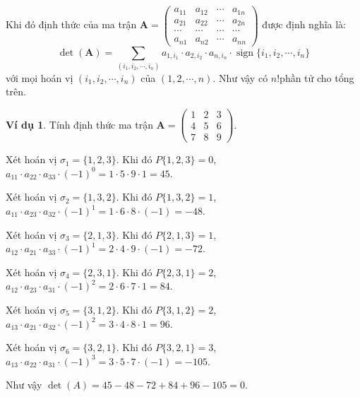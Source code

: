 \documentclass{mynotes}
\theoremstyle{definition}
\newtheorem{example}{Ví dụ}
\DeclareMathOperator{\sign}{sign}
\begin{document}
\begin{definition}
    Khi đó định thức của ma trận $\bm{A} = \begin{pmatrix}a_{11} & a_{12} & \cdots & a_{1n} \\ a_{21} & a_{22} & \cdots & a_{2n} \\ \cdots & \cdots & \cdots & \cdots \\ a_{n1} & a_{n2} & \cdots & a_{nn}\end{pmatrix}$ được định nghĩa là:
    \begin{equation}
        \det(\bm{A})=\displaystyle{\sum_{(i_1, i_2, \cdots, i_n)} a_{1, i_1} \cdot a_{2, i_2} \cdot a_{n, i_n} \cdot \sign\{i_1, i_2, \cdots, i_n\}}
    \end{equation}
    với mọi hoán vị $(i_1, i_2, \cdots, i_n)$ của $(1, 2, \cdots, n)$. Như vậy có $n!$​ phần tử cho tổng trên.
\end{definition}


\begin{example}
    Tính định thức ma trận $\bm{A}=\begin{pmatrix}1 & 2 & 3 \\ 4 & 5 & 6 \\ 7 & 8 & 9\end{pmatrix}$​.

    Xét hoán vị $\sigma_1 = \{1, 2, 3\}$​. Khi đó $P\{1, 2, 3\}=0$​, $a_{11} \cdot a_{22} \cdot a_{33} \cdot (-1)^0 = 1 \cdot 5 \cdot 9 \cdot 1 = 45$​.

    Xét hoán vị $\sigma_2 = \{1, 3, 2\}$​. Khi đó $P\{1, 3, 2\} = 1$​, $a_{11} \cdot a_{23} \cdot a_{32} \cdot (-1)^1 = 1 \cdot 6 \cdot 8 \cdot (-1) = -48$.

    Xét hoán vị $\sigma_3 = \{2, 1, 3\}$​. Khi đó $P\{2,1,3\}=1$​, $a_{12} \cdot a_{21} \cdot a_{33} \cdot (-1)^1 = 2 \cdot 4 \cdot 9 \cdot (-1) = -72$.

    Xét hoán vị $\sigma_4=\{2,3,1\}$. Khi đó $P\{2, 3, 1\} = 2$​, $a_{12} \cdot a_{23} \cdot a_{31} \cdot (-1)^2 = 2 \cdot 6 \cdot 7 \cdot 1 = 84$​.

    Xét hoán vị $\sigma_5=\{3, 1, 2\}$. Khi đó $P\{3, 1, 2\} = 2$​, $a_{13} \cdot a_{21} \cdot a_{32} \cdot (-1)^2 = 3 \cdot 4 \cdot 8 \cdot 1 = 96$​.

    Xét hoán vị $\sigma_6=\{3, 2, 1\}$​. Khi đó $P\{3, 2, 1\}=3$​, $a_{13} \cdot a_{22} \cdot a_{31} \cdot (-1)^3 = 3 \cdot 5 \cdot 7 \cdot  (-1) = -105$​.

    Như vậy $\det(A)=45-48-72+84+96-105=0$​.
\end{example}
\end{document}
